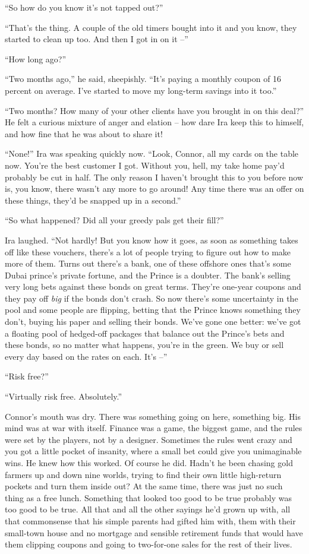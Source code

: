 ``So how do you know it's not tapped out?''

``That's the thing. A couple of the old timers bought into it and
you know, they started to clean up too. And then I got in on it
--''

``How long ago?''

``Two months ago,'' he said, sheepishly. ``It's paying a monthly
coupon of 16 percent on average. I've started to move my long-term
savings into it too.''

``Two months? How many of your other clients have you brought in on
this deal?'' He felt a curious mixture of anger and elation -- how
dare Ira keep this to himself, and how fine that he was about to
share it!

``None!'' Ira was speaking quickly now. ``Look, Connor, all my cards
on the table now. You're the best customer I got. Without you,
hell, my take home pay'd probably be cut in half. The only reason I
haven't brought this to you before now is, you know, there wasn't
any more to go around! Any time there was an offer on these things,
they'd be snapped up in a second.''

``So what happened? Did all your greedy pals get their fill?''

Ira laughed. ``Not hardly! But you know how it goes, as soon as
something takes off like these vouchers, there's a lot of people
trying to figure out how to make more of them. Turns out there's a
bank, one of these offshore ones that's some Dubai prince's private
fortune, and the Prince is a doubter. The bank's selling very long
bets against these bonds on great terms. They're one-year coupons
and they pay off \emph{big} if the bonds don't crash. So now
there's some uncertainty in the pool and some people are flipping,
betting that the Prince knows something they don't, buying his
paper and selling their bonds. We've gone one better: we've got a
floating pool of hedged-off packages that balance out the Prince's
bets and these bonds, so no matter what happens, you're in the
green. We buy or sell every day based on the rates on each. It's
--''

``Risk free?''

``Virtually risk free. Absolutely.''

Connor's mouth was dry. There was something going on here,
something big. His mind was at war with itself. Finance was a game,
the biggest game, and the rules were set by the players, not by a
designer. Sometimes the rules went crazy and you got a little
pocket of insanity, where a small bet could give you unimaginable
wins. He knew how this worked. Of course he did. Hadn't he been
chasing gold farmers up and down nine worlds, trying to find their
own little high-return pockets and turn them inside out? At the
same time, there was just no such thing as a free lunch. Something
that looked too good to be true probably was too good to be true.
All that and all the other sayings he'd grown up with, all that
commonsense that his simple parents had gifted him with, them with
their small-town house and no mortgage and sensible retirement
funds that would have them clipping coupons and going to
two-for-one sales for the rest of their lives.

